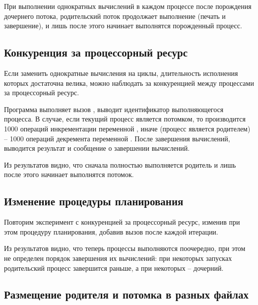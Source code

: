 При выполнении однократных вычислений в каждом процессе после порождения дочернего потока, родительский поток продолжает выполнение (печать и завершение), и лишь после этого начинает выполнятся порожденный процесс.


\subsection{Конкуренция за процессорный ресурс}

Если заменить однократные вычисления на циклы, длительность исполнения которых достаточна велика, можно наблюдать за конкуренцией между процессами за процессорный ресурс. 



Программа выполняет вызов , выводит идентификатор выполняющегося процесса. В случае, если текущий процесс является потомком, то производится 1000 операций инкрементации переменной , иначе (процесс является родителем) -- 1000 операций декремента переменной . После завершения вычислений, выводится результат и сообщение о завершении вычислений.



Из результатов видно, что сначала полностью выполняется родитель и лишь после этого начинает выполнятся потомок.

\subsection{Изменение процедуры планирования}

Повторим эксперимент с конкуренцией за процессорный ресурс, изменив при этом процедуру планирования, добавив вызов  после каждой итерации.



Из результатов видно, что теперь процессы выполняются поочередно, при этом не определен порядок завершения их вычислений: при некоторых запусках родительский процесс завершится раньше, а при некоторых -- дочерний.



\subsection{Размещение родителя и потомка в разных файлах}
\label{sec:father-son}

